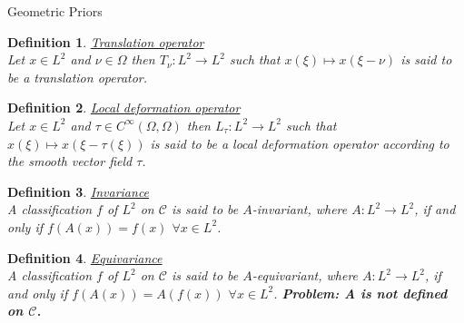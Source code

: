 \documentclass{article}
\newtheorem{defn}{Definition}[section]
\newcommand{\bb}[1]{\textbf{#1}}
\begin{document}
\begin{section}{Geometric Priors}
\begin{defn}\underline{Translation operator}\\
Let $x \in L^2$ and $\nu \in \Omega$ then $T_\nu:L^2 \to L^2$ such that $x(\xi) \mapsto x(\xi - \nu)$
is said to be a translation operator.
\end{defn}

\begin{defn}\underline{Local deformation operator}\\
Let $x \in L^2$ and $\tau \in C^\infty(\Omega,\Omega)$ then $L_\tau:L^2 \to L^2$ such that $x(\xi) \mapsto x(\xi-\tau(\xi))$
is said to be a local deformation operator according to the smooth vector field $\tau$.
\end{defn}

\begin{defn}\underline{Invariance}\\
A classification $f$ of $L^2$ on $\mathcal{C}$ is said to be $A$-invariant, where
$A:L^2 \to L^2$, if and only if $f(A(x))=f(x)$  $\forall x \in L^2$.
\end{defn}

\begin{defn}\underline{Equivariance}\\
A classification $f$ of $L^2$ on $\mathcal{C}$ is said to be $A$-equivariant, where
$A:L^2 \to L^2$, if and only if $f(A(x))=A(f(x))$  $\forall x \in L^2$.
\bb{Problem: A is not defined on $\mathcal{C}$.}
\end{defn}


\end{section}
\end{document}

